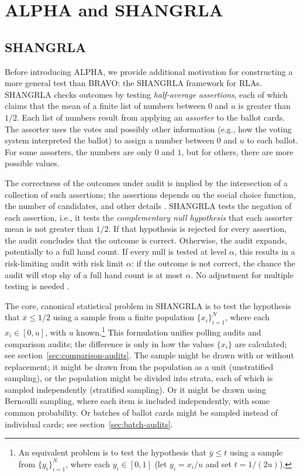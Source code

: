 \documentclass[12pt,runningheads]{llncs}
\begin{document}
{\section{ALPHA and SHANGRLA}

\subsection{SHANGRLA} \label{sec:shangrla}
Before introducing ALPHA, we provide additional motivation for constructing a more general test than BRAVO: 
the SHANGRLA framework for RLAs.
SHANGRLA \cite{stark20} checks outcomes by testing \emph{half-average assertions}, each of which claims 
that the mean of a finite list of
numbers between $0$ and $u$ is greater than $1/2$.
Each list of numbers result from applying an \emph{assorter} to the ballot cards.
The assorter uses the votes and possibly other information (e.g., how the voting system interpreted the ballot)
to assign a number between $0$ and $u$ to each ballot.
For some assorters, the numbers are only $0$ and $1$, but for others, there are more possible values.

The correctness of the outcomes under audit is implied by the intersection of a collection of such assertions;
the assertions depends on the social choice function, the number of candidates, and other details \cite{stark20}.
SHANGRLA tests the negation of each assertion, i.e., it tests the
\emph{complementary null hypothesis} that each assorter mean is not greater than $1/2$.
If that hypothesis is rejected for every assertion,
the audit concludes that the outcome is correct.
Otherwise, the audit expands, potentially to a full hand count.
If every null is tested at level $\alpha$, this results in a risk-limiting
audit with risk limit $\alpha$: if the outcome is not correct, the chance the audit will stop
shy of a full hand count is at most $\alpha$.
No adjustment for multiple testing is needed \cite{stark20}.

The core, canonical statistical problem in SHANGRLA is to test the hypothesis that $\bar{x} \le 1/2$ using a 
sample from a finite population $\{x_i\}_{i=1}^N$, 
where each $x_i \in [0, u]$, with $u$ known.\footnote{%
An equivalent problem is to test the hypothesis that 
$\bar{y} \le t$ using a sample from $\{y_i\}_{i=1}^N$, where each $y_i \in [0, 1]$ (let $y_i = x_i/u$ and set $t=1/(2u)$).
}
This formulation unifies polling audits and comparison audits; the difference is only in how the 
values $\{x_i\}$ are calculated; see section~\ref{sec:comparison-audits}.
The sample might be drawn with or without replacement; it might be drawn from the population as a unit 
(unstratified sampling), or the population might be divided into strata, each of which is sampled independently (stratified sampling).
Or it might be drawn using Bernoulli sampling, where each item is included independently, with some common probability.
Or batches of ballot cards might be sampled instead of individual cards; see section~\ref{sec:batch-audits}.

}
\end{document}
